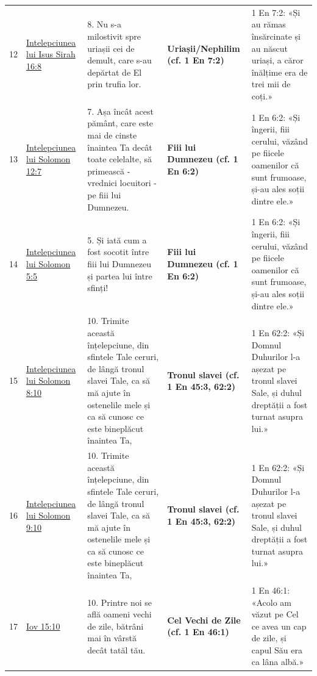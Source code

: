 \documentclass[12pt,a4paper,twoside,openany]{book}
\begin{document}
\begin{longtable}{L{0.8cm}L{0.8cm}L{8.4cm}L{0.9cm}L{3.6cm}}
12 & \href{https://bibliaortodoxa.ro/carte.php?id=72\&cap=16\#8}{Intelepciunea lui Isus Sirah 16:8} & 8. Nu s-a milostivit spre uriașii cei de demult, care s-au depărtat de El prin trufia lor. & \textbf{Uriașii/Nephilim (cf. 1 En 7:2)} & 1 En 7:2: «Și au rămas însărcinate și au născut uriași, a căror înălțime era de trei mii de coți.» \\
13 & \href{https://bibliaortodoxa.ro/carte.php?id=74\&cap=12\#7}{Intelepciunea lui Solomon 12:7} & 7. Așa încât acest pământ, care este mai de cinste înaintea Ta decât toate celelalte, să primească - vrednici locuitori - pe fiii lui Dumnezeu. & \textbf{Fiii lui Dumnezeu (cf. 1 En 6:2)} & 1 En 6:2: «Și îngerii, fiii cerului, văzând pe fiicele oamenilor că sunt frumoase, și-au ales soții dintre ele.» \\
14 & \href{https://bibliaortodoxa.ro/carte.php?id=74\&cap=5\#5}{Intelepciunea lui Solomon 5:5} & 5. Și iată cum a fost socotit între fiii lui Dumnezeu și partea lui între sfinți! & \textbf{Fiii lui Dumnezeu (cf. 1 En 6:2)} & 1 En 6:2: «Și îngerii, fiii cerului, văzând pe fiicele oamenilor că sunt frumoase, și-au ales soții dintre ele.» \\
15 & \href{https://bibliaortodoxa.ro/carte.php?id=74\&cap=8\#10}{Intelepciunea lui Solomon 8:10} & 10. Trimite această înțelepciune, din sfintele Tale ceruri, de lângă tronul slavei Tale, ca să mă ajute în ostenelile mele și ca să cunosc ce este bineplăcut înaintea Ta, & \textbf{Tronul slavei (cf. 1 En 45:3, 62:2)} & 1 En 62:2: «Și Domnul Duhurilor l-a așezat pe tronul slavei Sale, și duhul dreptății a fost turnat asupra lui.» \\
16 & \href{https://bibliaortodoxa.ro/carte.php?id=74\&cap=9\#10}{Intelepciunea lui Solomon 9:10} & 10. Trimite această înțelepciune, din sfintele Tale ceruri, de lângă tronul slavei Tale, ca să mă ajute în ostenelile mele și ca să cunosc ce este bineplăcut înaintea Ta, & \textbf{Tronul slavei (cf. 1 En 45:3, 62:2)} & 1 En 62:2: «Și Domnul Duhurilor l-a așezat pe tronul slavei Sale, și duhul dreptății a fost turnat asupra lui.» \\
17 & \href{https://bibliaortodoxa.ro/carte.php?id=42\&cap=15\#10}{Iov 15:10} & 10. Printre noi se află oameni vechi de zile, bătrâni mai în vârstă decât tatăl tău. & \textbf{Cel Vechi de Zile (cf. 1 En 46:1)} & 1 En 46:1: «Acolo am văzut pe Cel ce avea un cap de zile, și capul Său era ca lâna albă.» \\

\end{longtable}
\end{document}
